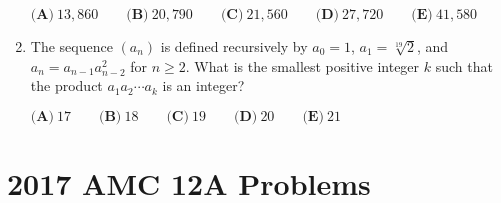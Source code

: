\documentclass{article}
\begin{document}
\begin{enumerate}[label=\arabic*., itemsep=0.5em]
\(\textbf{(A)}\ 13,860\qquad\textbf{(B)}\ 20,790\qquad\textbf{(C)}\ 21,560 \qquad\textbf{(D)}\ 27,720 \qquad\textbf{(E)}\ 41,580\)\par \vspace{0.5em}\item The sequence \((a_n)\) is defined recursively by \(a_0=1\), \(a_1=\sqrt[19]{2}\), and \(a_n=a_{n-1}a_{n-2}^2\) for \(n\geq 2\). What is the smallest positive integer \(k\) such that the product \(a_1a_2\cdots a_k\) is an integer?

\(\textbf{(A)}\ 17\qquad\textbf{(B)}\ 18\qquad\textbf{(C)}\ 19\qquad\textbf{(D)}\ 20\qquad\textbf{(E)}\ 21\)\par \vspace{0.5em}\end{enumerate}\newpage\section*{2017 AMC 12A Problems}
\end{document}
